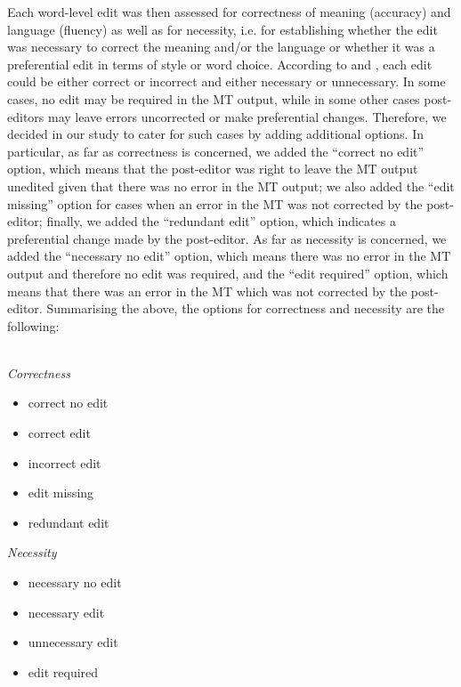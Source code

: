 \documentclass[output=paper]{langscibook}
\begin{document}
Each word-level edit was then assessed for correctness of meaning (accuracy) and language (fluency) as well as for necessity, i.e. for establishing whether the edit was necessary to correct the meaning and/or the language or whether it was a preferential edit in terms of style or word choice. According to \citet{KoponenSalmi2017} and \citet{KoponenNikulin2019}, each edit could be either correct or incorrect and either necessary or unnecessary. In some cases, no edit may be required in the MT output, while in some other cases post-editors may leave errors uncorrected or make preferential changes. Therefore, we decided in our study to cater for such cases by adding additional options. In particular, as far as correctness is concerned, we added the “correct no edit” option, which means that the post-editor was right to leave the MT output unedited given that there was no error in the MT output; we also added the “edit missing” option for cases when an error in the MT was not corrected by the post-editor; finally, we added the “redundant edit” option, which indicates a preferential change made by the post-editor. As far as necessity is concerned, we added the “necessary no edit” option, which means there was no error in the MT output and therefore no edit was required, and the “edit required” option, which means that there was an error in the MT which was not corrected by the post-editor. Summarising the above, the options for correctness and necessity are the following:\\\\
\noindent\begin{minipage}[t]{.5\linewidth}\textit{Correctness}
\begin{itemize}[noitemsep,nosep]
    \item correct no edit
    \item correct edit
    \item incorrect edit
    \item edit missing
    \item redundant edit
\end{itemize}\end{minipage}%
\begin{minipage}[t]{.5\linewidth}\textit{Necessity}
\begin{itemize}[noitemsep,nosep]
    \item necessary no edit
    \item necessary edit
    \item unnecessary edit
    \item edit required
\end{itemize}\end{minipage}
\end{document}
